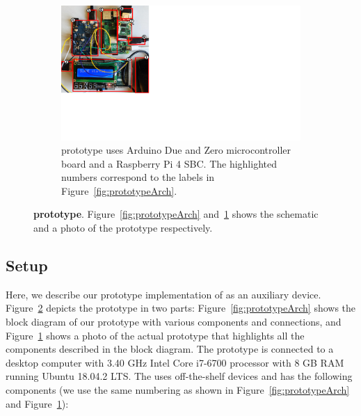 \begin{figure}[!htpb]
    \begin{center}
        \begin{subfigure}{\textwidth}
        \centering
        \includegraphics[trim={0 6.6cm 21.5cm 0}, clip, scale=0.55]{chapters/ProtectIOn/images/setUp_1.pdf}
        \caption{\name \device prototype uses Arduino Due and Zero microcontroller board and a Raspberry Pi 4 SBC. The highlighted numbers correspond to the labels in Figure~\ref{fig:prototypeArch}.}
        \label{fig:prototype}
    \end{subfigure}
    \end{center}
    
    \caption[\name prototype]{\textbf{\name prototype}. Figure~\ref{fig:prototypeArch} and~\ref{fig:prototype} shows the schematic and a photo of the  \name \device prototype respectively.} 
    \label{fig:prototypeAll}
\end{figure}


\subsection{Setup} Here, we describe our prototype implementation of \name as an auxiliary device. Figure~\ref{fig:prototypeAll} depicts the \name prototype in two parts: Figure~\ref{fig:prototypeArch} shows the block diagram of our prototype with various components and connections, and Figure~\ref{fig:prototype} shows a photo of the actual prototype that highlights all the components described in the block diagram. The prototype \device is connected to a desktop computer with 3.40 GHz Intel Core i7-6700 processor with 8 GB RAM running Ubuntu 18.04.2 LTS. The \device uses off-the-shelf devices and has the following components (we use the same numbering as shown in Figure~\ref{fig:prototypeArch} and  Figure~\ref{fig:prototype}):

